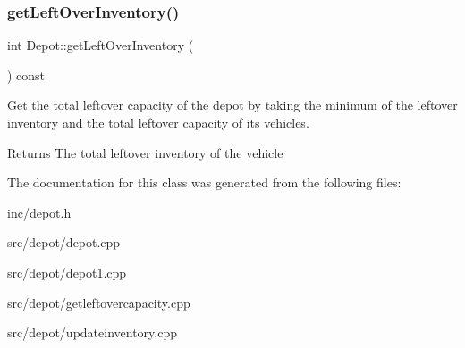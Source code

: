 \subsubsection{\texorpdfstring{get\+Left\+Over\+Inventory()}{getLeftOverInventory()}}
{\footnotesize\ttfamily int Depot\+::get\+Left\+Over\+Inventory (\begin{DoxyParamCaption}{ }\end{DoxyParamCaption}) const}



Get the total leftover capacity of the depot by taking the minimum of the leftover inventory and the total leftover capacity of its vehicles. 

\begin{DoxyReturn}{Returns}
The total leftover inventory of the vehicle 
\end{DoxyReturn}


The documentation for this class was generated from the following files\+:\begin{DoxyCompactItemize}
\item 
inc/depot.\+h\item 
src/depot/depot.\+cpp\item 
src/depot/depot1.\+cpp\item 
src/depot/getleftovercapacity.\+cpp\item 
src/depot/updateinventory.\+cpp\end{DoxyCompactItemize}
